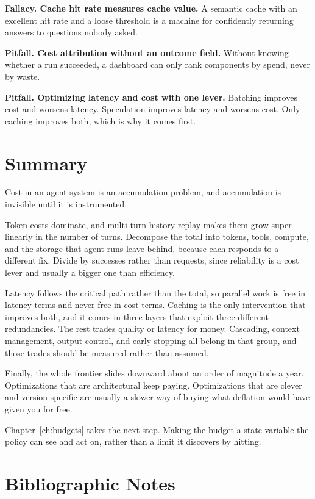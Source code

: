 \textbf{Fallacy. Cache hit rate measures cache value.} A semantic cache with an
excellent hit rate and a loose threshold is a machine for confidently returning
answers to questions nobody asked.

\textbf{Pitfall. Cost attribution without an outcome field.} Without knowing
whether a run succeeded, a dashboard can only rank components by spend, never by
waste.

\textbf{Pitfall. Optimizing latency and cost with one lever.} Batching improves
cost and worsens latency. Speculation improves latency and worsens cost. Only
caching improves both, which is why it comes first.

\section{Summary}

Cost in an agent system is an accumulation problem, and accumulation is invisible
until it is instrumented.

Token costs dominate, and multi-turn history replay makes them grow
super-linearly in the number of turns. Decompose the total into tokens, tools,
compute, and the storage that agent runs leave behind, because each responds to a
different fix. Divide by successes rather than requests, since reliability is a
cost lever and usually a bigger one than efficiency.

Latency follows the critical path rather than the total, so parallel work is free
in latency terms and never free in cost terms. Caching is the only intervention
that improves both, and it comes in three layers that exploit three different
redundancies. The rest trades quality or latency for money. Cascading, context management, output control, and early stopping all belong in that group, and those trades should be measured rather than assumed.

Finally, the whole frontier slides downward about an order of magnitude a year.
Optimizations that are architectural keep paying. Optimizations that are clever
and version-specific are usually a slower way of buying what deflation would have
given you for free.

Chapter~\ref{ch:budgets} takes the next step. Making the budget a state variable
the policy can see and act on, rather than a limit it discovers by hitting.

\section*{Bibliographic Notes}

